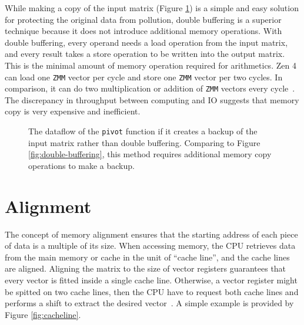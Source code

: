 \documentclass[logo,bsc,singlespacing,parskip]{infthesis}
\newcommand{\pivot}{\texttt{pivot}}
\newcommand{\zmm}{\texttt{ZMM}}
\begin{document}
While making a copy of the input matrix (Figure \ref{fig:single-buffering}) 
is a simple and easy solution for
protecting the original data from pollution, double buffering is a superior
technique because it does not introduce additional memory operations. With
double buffering, every operand needs a load operation from the input matrix,
and every result takes a store operation to be written into the output matrix.
This is the minimal amount of memory operation required for arithmetics. Zen 4
can load one \zmm{} vector per cycle and store one \zmm{} vector per two
cycles. In comparison, it can do two multiplication or addition of \zmm{}
vectors every cycle~\cite{Zen4Critique}. The discrepancy in throughput between computing and IO
suggests that memory copy is very expensive and inefficient. 
\begin{figure}
\centering
{}
\caption{The dataflow of the \pivot{} function if it creates a
backup of the input matrix rather than double buffering. Comparing to 
Figure \ref{fig:double-buffering}, 
this method requires additional memory copy operations to make a backup.}
\label{fig:single-buffering}
\end{figure}


\section{Alignment}


The concept of memory alignment ensures that the starting address of each piece
of data is a multiple of its size. When accessing memory, the CPU retrieves data
from the main memory or cache in the unit of ``cache line'', and the cache lines
are aligned. Aligning the matrix to the size of vector registers guarantees that
every vector is fitted inside a single cache line. Otherwise, a vector register
might be spitted on two cache lines, then the CPU have to request both cache
lines and performs a shift to extract the desired vector~\cite{Unaligned}. A
simple example is provided by Figure \ref{fig:cacheline}.
\end{document}
